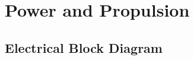 \chapter{Power and Propulsion}
\setlength{\parindent}{15pt}
\label{ch:powe_prop}

\section{Electrical Block Diagram}
\label{sec:elec_bloc_diag}

